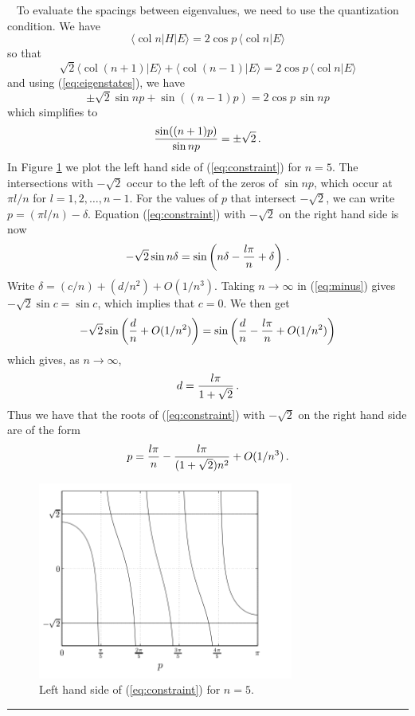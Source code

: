 \documentclass[aps,11pt,twoside,nofootinbib,tightenlines,superscriptaddress,preprintnumbers]{revtex4}
\newcommand{\<}{\langle}
\renewcommand{\>}{\rangle}
\newcommand{\be}{\begin{equation}}
\newcommand{\ee}{\end{equation}}
\newcommand{\col}{\mathop{\mathrm{col}}\nolimits}
\newcommand{\qed}{\rule{7pt}{7pt}}
\newenvironment{proof}
  {\trivlist\item\noindent{\bf Proof}~}
  {\qed\endtrivlist}
\begin{document}
\begin{proof}
To evaluate the spacings between eigenvalues, we need to use the
quantization condition.  We have
\be
  \<\col n|H|E\> = 2 \cos p \, \<\col n|E\>
\ee
so that
\be
  \sqrt2 \<\col(n+1)|E\> + \<\col(n-1)|E\> = 2 \cos p \, \<\col n|E\>
\ee
and using (\ref{eq:eigenstates}), we have
\be
  \pm \sqrt2 \sin np + \sin((n-1)p) = 2 \cos p \, \sin np
\ee
which simplifies to
\be
  {\sin((n+1)p) \over \sin np} = \pm \sqrt 2
\,.
\label{eq:constraint}
\ee
In Figure \ref{fig:constraint} we plot the left hand side of
(\ref{eq:constraint}) for $n=5$.  The intersections with $-\sqrt2$ occur
to the left of the zeros of $\sin np$, which occur at $\pi l/n$ for
$l=1,2,\ldots,n-1$.  For the values of $p$ that intersect $-\sqrt 2$, we
can write $p=(\pi l/n)-\delta$.  Equation (\ref{eq:constraint}) with
$-\sqrt2$ on the right hand side is now
\be
  -\sqrt2 \sin n\delta = \sin\left(n\delta - {l\pi \over n} + \delta\right)
\,.
\label{eq:minus}
\ee
Write $\delta = (c/n) + (d/n^2) + O(1/n^3)$.  Taking $n\to\infty$ in
(\ref{eq:minus}) gives $-\sqrt2 \sin c = \sin c$, which implies that
$c=0$.  We then get
\be
  -\sqrt2 \sin\left({d \over n}+O(1/n^2)\right) 
        = \sin\left({d \over n}-{l \pi \over n}+O(1/n^2)\right)
\ee
which gives, as $n\to\infty$,
\be
  d = {l \pi \over 1+\sqrt 2}
\,.
\ee
Thus we have that the roots of (\ref{eq:constraint}) with $-\sqrt2$ on the
right hand side are of the form
\be
  p = {l \pi \over n} - {l \pi \over (1+\sqrt 2)n^2} + O(1/n^3)
\,.
\ee

\begin{figure}
\includegraphics[width=3.3in]{cons}
\caption{Left hand side of (\ref{eq:constraint}) for $n=5$.}
\label{fig:constraint}
\end{figure}


\end{proof}
\end{document}
